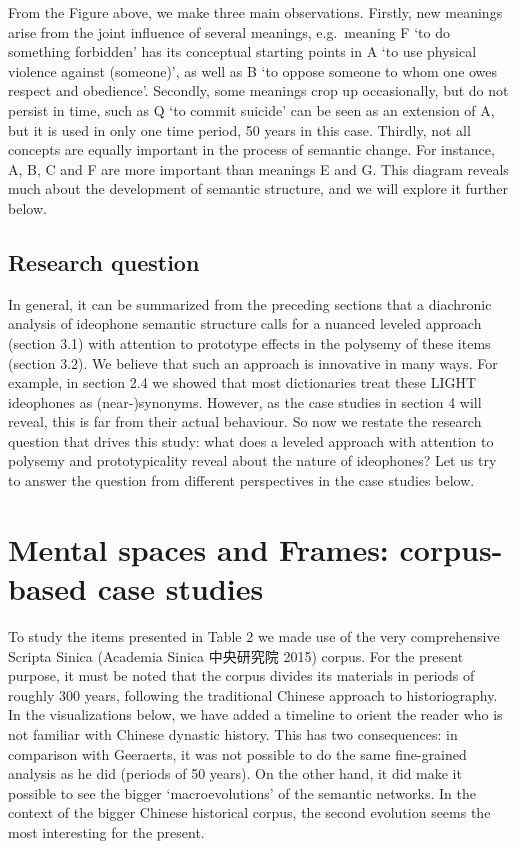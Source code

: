 \documentclass[12pt,article,oneside]{memoir}
\theoremstyle{definition}
\theoremstyle{definition}
\theoremstyle{definition}
\theoremstyle{remark}
\begin{document}
From the Figure above, we make three main observations. Firstly, new
meanings arise from the joint influence of several meanings,
e.g.~meaning F `to do something forbidden' has its conceptual starting
points in A `to use physical violence against (someone)', as well as B
`to oppose someone to whom one owes respect and obedience'. Secondly,
some meanings crop up occasionally, but do not persist in time, such as
Q `to commit suicide' can be seen as an extension of A, but it is used
in only one time period, 50 years in this case. Thirdly, not all
concepts are equally important in the process of semantic change. For
instance, A, B, C and F are more important than meanings E and G. This
diagram reveals much about the development of semantic structure, and we
will explore it further below.

\subsection{Research question}\label{research-question}

In general, it can be summarized from the preceding sections that a
diachronic analysis of ideophone semantic structure calls for a nuanced
leveled approach (section 3.1) with attention to prototype effects in
the polysemy of these items (section 3.2). We believe that such an
approach is innovative in many ways. For example, in section 2.4 we
showed that most dictionaries treat these LIGHT ideophones as
(near-)synonyms. However, as the case studies in section 4 will reveal,
this is far from their actual behaviour. So now we restate the research
question that drives this study: what does a leveled approach with
attention to polysemy and prototypicality reveal about the nature of
ideophones? Let us try to answer the question from different
perspectives in the case studies below.

\section{Mental spaces and Frames: corpus-based case
studies}\label{mental-spaces-and-frames-corpus-based-case-studies}

To study the items presented in Table 2 we made use of the very
comprehensive Scripta Sinica (Academia Sinica 中央研究院 2015) corpus.
For the present purpose, it must be noted that the corpus divides its
materials in periods of roughly 300 years, following the traditional
Chinese approach to historiography. In the visualizations below, we have
added a timeline to orient the reader who is not familiar with Chinese
dynastic history. This has two consequences: in comparison with
Geeraerts, it was not possible to do the same fine-grained analysis as
he did (periods of 50 years). On the other hand, it did make it possible
to see the bigger `macroevolutions' of the semantic networks. In the
context of the bigger Chinese historical corpus, the second evolution
seems the most interesting for the present.
\end{document}
